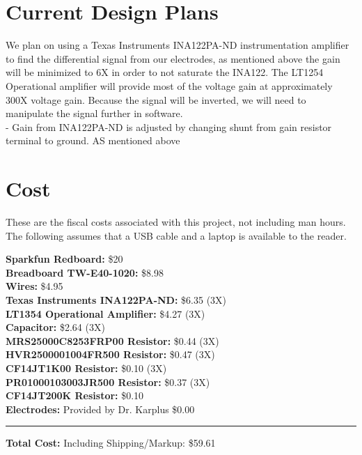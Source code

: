 \documentclass[11pt, oneside]{article}   	%
\begin{document}
\section{Current Design Plans}
We plan on using a Texas Instruments INA122PA-ND instrumentation amplifier to find the differential signal from our electrodes, as mentioned above the gain will be minimized to 6X in order to not saturate the INA122. \cite{INA122PA-ND} The LT1254 Operational amplifier will provide most of the voltage gain at approximately 300X voltage gain.  Because the signal will be inverted, we will need to manipulate the signal further in software. \\
\noindent - Gain from INA122PA-ND is adjusted by changing shunt from gain resistor terminal to ground. AS mentioned above\\


\section{Cost}
These are the fiscal costs associated with this project, not including man hours. The following assumes that a USB cable and a laptop is available to the reader.

\noindent \textbf{Sparkfun Redboard:} \hfill \$20\\
\textbf{Breadboard TW-E40-1020:} \hfill \$8.98\\
\textbf{Wires:} \hfill \$4.95\\
\textbf{Texas Instruments INA122PA-ND:}  \hfill \$6.35 (3X)\\
\textbf{LT1354 Operational Amplifier:} \hfill \$4.27 (3X)\\
\textbf{Capacitor:} \hfill \$2.64 (3X)\\
\textbf{MRS25000C8253FRP00 Resistor:} \hfill\$0.44 (3X)\\
\textbf{HVR2500001004FR500 Resistor:} \hfill\$0.47 (3X)\\
\textbf{CF14JT1K00 Resistor:} \hfill\$0.10 (3X)\\
\textbf{PR01000103003JR500 Resistor:} \hfill\$0.37 (3X)\\
\textbf{CF14JT200K Resistor:} \hfill \$0.10\\
\textbf{Electrodes:} Provided by Dr. Karplus \hfill \$0.00\\
\rule{\textwidth}{1pt}
\textbf{Total Cost:} \hfill Including Shipping/Markup: \$59.61\\
\pagebreak
\end{document}

